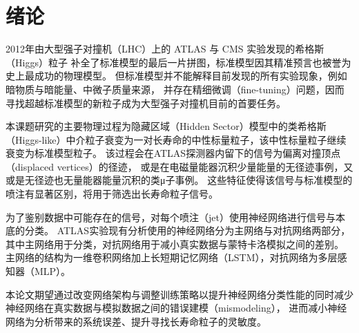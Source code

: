 
\chapter{绪论}

2012年由大型强子对撞机（LHC）上的 ATLAS 与 CMS 实验发现的希格斯（Higgs）粒子
\cite{aad2012observation} 补全了标准模型的最后一片拼图，标准模型因其精准预言也被誉为史上最成功的物理模型。
但标准模型并不能解释目前发现的所有实验现象，例如暗物质与暗能量、中微子质量来源，
并存在精细微调（fine-tuning）问题，因而寻找超越标准模型的新粒子成为大型强子对撞机目前的首要任务。

本课题研究的主要物理过程为隐藏区域（Hidden Sector）模型中的类希格斯（Higgs-like）中介粒子衰变为一对长寿命的中性标量粒子，该中性标量粒子继续衰变为标准模型粒子。
该过程会在ATLAS探测器内留下的信号为偏离对撞顶点（displaced vertices）的径迹，
或是在电磁量能器沉积少量能量的无径迹事例，又或是无径迹也无量能器能量沉积的类μ子事例。
这些特征使得该信号与标准模型的喷注有显著区别，将用于筛选出长寿命粒子信号。

为了鉴别数据中可能存在的信号，对每个喷注（jet）使用神经网络进行信号与本底的分类。
ATLAS实验现有分析\cite{ATLAS:2022zhj}使用的神经网络分为主网络与对抗网络两部分，其中主网络用于分类，对抗网络用于减小真实数据与蒙特卡洛模拟之间的差别。
主网络的结构为一维卷积网络加上长短期记忆网络（LSTM），对抗网络为多层感知器（MLP）。

本论文期望通过改变网络架构与调整训练策略以提升神经网络分类性能的同时减少神经网络在真实数据与模拟数据之间的错误建模（mismodeling），
进而减小神经网络为分析带来的系统误差、提升寻找长寿命粒子的灵敏度。
